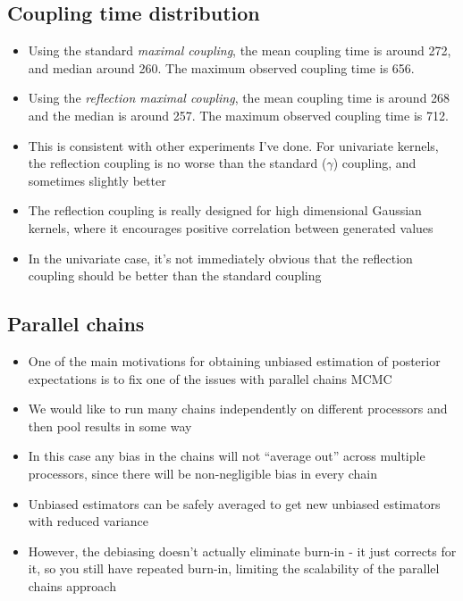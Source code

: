\documentclass[11pt,a4paper]{article}
\begin{document}
  \subsection{Coupling time distribution}
  \begin{itemize}
    \item Using the standard \emph{maximal coupling}, the mean coupling time is around 272, and median around 260. The maximum observed coupling time is 656.
    \item Using the \emph{reflection maximal coupling}, the mean coupling time is around 268 and the median is around 257. The maximum observed coupling time is 712.
    \item This is consistent with other experiments I've done. For univariate kernels, the reflection coupling is no worse than the standard ($\gamma$) coupling, and sometimes slightly better
    \item The reflection coupling is really designed for high dimensional Gaussian kernels, where it encourages positive correlation between generated values
      \item In the univariate case, it's not immediately obvious that the reflection coupling should be better than the standard coupling
  \end{itemize}



\subsection{Parallel chains}
\begin{itemize}
\item One of the main motivations for obtaining unbiased estimation of posterior expectations is to fix one of the issues with parallel chains MCMC
\item We would like to run many chains independently on different processors and then pool results in some way
\item In this case any bias in the chains will not ``average out'' across multiple processors, since there will be non-negligible bias in every chain
\item Unbiased estimators can be safely averaged to get new unbiased estimators with reduced variance
\item However, the debiasing doesn't actually eliminate burn-in - it just corrects for it, so you still have repeated burn-in, limiting the scalability of the parallel chains approach
\end{itemize}
\end{document}
